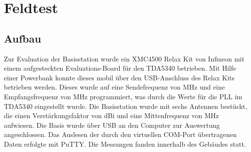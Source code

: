 \chapter{Feldtest}
\label{sec:Feldtest}
\pagestyle{scrheadings}
\section{Aufbau}
Zur Evaluation der Basisstation wurde ein  XMC4500 Relax Kit von Infineon mit einem aufgesteckten Evaluations-Board für den TDA5340 betrieben. Mit Hilfe einer Powerbank konnte dieses mobil über den \ac{USB}-Anschluss des Relax Kits betrieben werden.
Dieses wurde auf eine Sendefrequenz von \unit[868,0]{MHz} und eine Empfangsfrequenz von \unit[867,999]{MHz} programmiert, was durch die Werte für die \ac{PLL} im TDA5340 eingestellt wurde. 
Die Basisstation wurde mit sechs Antennen bestückt, die einen Verstärkungsfaktor von \unit[3,6]{dBi} und eine Mittenfrequenz von \unit[868]{MHz} aufwiesen. Die Basis wurde über \ac{USB} an den Computer zur Auswertung angeschlossen. Das Auslesen der durch den virtuellen COM-Port übertragenen Daten erfolgte mit  PuTTY. Die Messungen fanden innerhalb des Gebäudes statt.


